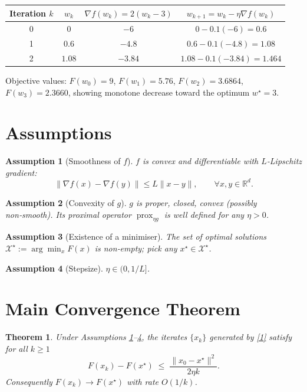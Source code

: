 \documentclass{article}
\newtheorem{theorem}{Theorem}
\newtheorem{assumption}{Assumption}
\newcommand{\prox}{\operatorname{prox}}
\newcommand{\R}{\mathbb{R}}
\begin{document}
\begin{center}
\begin{tabular}{c|c|c|c}
Iteration $k$ & $w_k$ & $\nabla f(w_k)=2(w_k-3)$ & $w_{k+1}=w_k-\eta\nabla f(w_k)$\\ \hline
0 & $0$ & $-6$ & $0-0.1(-6)=0.6$\\
1 & $0.6$ & $-4.8$ & $0.6-0.1(-4.8)=1.08$\\
2 & $1.08$ & $-3.84$ & $1.08-0.1(-3.84)=1.464$\\
\end{tabular}
\end{center}
Objective values: $F(w_0)=9$, $F(w_1)=5.76$, $F(w_2)=3.6864$, $F(w_3)=2.3660$, showing monotone decrease toward the optimum $w^\star=3$.

\newpage
\section*{Assumptions}
\begin{assumption}[Smoothness of $f$]\label{as:lip}
$f$ is convex and differentiable with $L$‑Lipschitz gradient:
\[
\|\nabla f(x)-\nabla f(y)\|\le L\|x-y\|,\qquad\forall x,y\in\R^{d}.
\]
\end{assumption}
\begin{assumption}[Convexity of $g$]\label{as:conv}
$g$ is proper, closed, convex (possibly non‑smooth). Its proximal operator $\prox_{\eta g}$ is well defined for any $\eta>0$.
\end{assumption}
\begin{assumption}[Existence of a minimiser]\label{as:opt}
The set of optimal solutions $\mathcal{X}^\star:=\arg\min_{x}F(x)$ is non‑empty; pick any $x^\star\in\mathcal{X}^\star$.
\end{assumption}
\begin{assumption}[Stepsize]\label{as:step}
$\eta\in(0,1/L]$.
\end{assumption}

\section*{Main Convergence Theorem}
\begin{theorem}\label{thm:rate}
Under Assumptions \ref{as:lip}–\ref{as:step}, the iterates $\{x_k\}$ generated by \eqref{1} satisfy for all $k\ge1$
\[
F(x_k)-F(x^\star)\;\le\;\frac{\|x_0-x^\star\|^{2}}{2\eta k}.
\tag{2}
\]
Consequently $F(x_k)\to F(x^\star)$ with rate $O(1/k)$.
\end{theorem}
\end{document}
